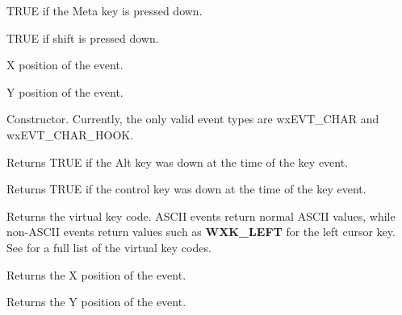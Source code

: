 
TRUE if the Meta key is pressed down.



TRUE if shift is pressed down.



X position of the event.



Y position of the event.



Constructor. Currently, the only valid event types are wxEVT\_CHAR and wxEVT\_CHAR\_HOOK.



Returns TRUE if the Alt key was down at the time of the key event.



Returns TRUE if the control key was down at the time of the key event.



Returns the virtual key code. ASCII events return normal ASCII values,
while non-ASCII events return values such as {\bf WXK\_LEFT} for the
left cursor key. See  for a full list of the virtual key codes.



Returns the X position of the event.



Returns the Y position of the event.




